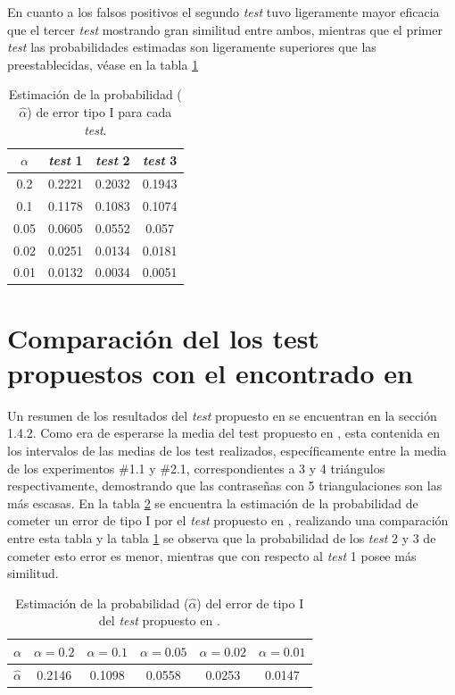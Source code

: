 \documentclass[12pt]{report}
\begin{document}
En cuanto a los falsos positivos  el segundo \textit{test} tuvo ligeramente mayor eficacia que el tercer \textit{test} mostrando gran similitud entre ambos, mientras que el primer \textit{test} las probabilidades estimadas son ligeramente superiores que las preestablecidas, véase en la tabla \ref{tab:error1}
\begin{table}[h!]
	\centering
	\begin{tabular}{|c|ccc|}
		\hline
		$\alpha$& \textit{test} 1 & \textit{test} 2 & \textit{test} 3  \\
		\hline
		0.2 &  0.2221    & 0.2032    &  0.1943   \\
		0.1 &  0.1178    & 0.1083    &  0.1074   \\
		0.05&  0.0605    & 0.0552    &  0.057   \\
		0.02&  0.0251    & 0.0134    &  0.0181   \\
		0.01&  0.0132    & 0.0034    &  0.0051   \\
		\hline
	\end{tabular}
	\caption{Estimación de la probabilidad ($\hat{\alpha}$) de error tipo I para cada \textit{test}.}
	\label{tab:error1}
\end{table}
\section{Comparación del los test propuestos con el encontrado en  \cite{13}}
Un resumen de los resultados del \textit{test} propuesto en \cite{13} se encuentran en la sección 1.4.2. Como era de esperarse la media del test propuesto en \cite{13}, esta contenida en los intervalos de las medias de los test realizados, específicamente entre la media de los experimentos \#1.1 y \#2.1, correspondientes a 3 y 4 triángulos respectivamente, demostrando que las contraseñas con 5 triangulaciones son las más escasas. En la tabla \ref{tab:erro1-sensor} se encuentra la estimación de la probabilidad de cometer un error de tipo I por el \textit{test} propuesto en \cite{13}, realizando una comparación entre esta tabla y la tabla \ref{tab:error1} se observa que la probabilidad de los \textit{test} 2 y 3 de cometer esto error es menor, mientras que con respecto al \textit{test} 1 posee más similitud. 
\begin{table}[h!]
	\centering
	\begin{tabular}{|c|ccccc|}
		\hline
		$\alpha$ & $\alpha = 0.2$ & $\alpha = 0.1$ & $\alpha = 0.05$ & $\alpha = 0.02$ & $\alpha = 0.01$ \\
		\hline
		$\hat{\alpha}$ & 0.2146 & 0.1098 & 0.0558 & 0.0253 & 0.0147 \\
		\hline
	\end{tabular}
	\caption{Estimación de la probabilidad ($\hat{\alpha}$) del error de tipo I del \textit{test} propuesto en \cite{13}.}
	\label{tab:erro1-sensor}
\end{table}
\end{document}
